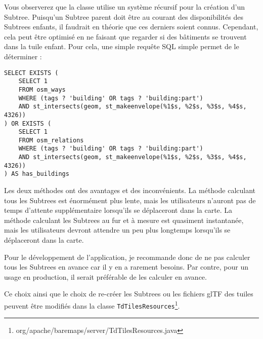 Vous observerez que la classe utilise un système récursif pour la création d'un Subtree. Puisqu'un Subtree parent doit être au courant des disponibilités des Subtrees enfants, il faudrait en théorie que ces derniers soient connus. Cependant, cela peut être optimisé en ne faisant que regarder si des bâtiments se trouvent dans la tuile enfant. Pour cela, une simple requête SQL simple permet de le déterminer :

\begin{verbatim}
SELECT EXISTS (
    SELECT 1
    FROM osm_ways
    WHERE (tags ? 'building' OR tags ? 'building:part')
    AND st_intersects(geom, st_makeenvelope(%1$s, %2$s, %3$s, %4$s, 4326))
) OR EXISTS (
    SELECT 1
    FROM osm_relations
    WHERE (tags ? 'building' OR tags ? 'building:part')
    AND st_intersects(geom, st_makeenvelope(%1$s, %2$s, %3$s, %4$s, 4326))
) AS has_buildings
\end{verbatim}

Les deux méthodes ont des avantages et des inconvénients. La méthode calculant tous les Subtrees est énormément plus lente, mais les utilisateurs n'auront pas de temps d'attente supplémentaire lorsqu'ils se déplaceront dans la carte. La méthode calculant les Subtrees au fur et à mesure est quasiment instantanée, mais les utilisateurs devront attendre un peu plus longtemps lorsqu'ils se déplaceront dans la carte.

Pour le développement de l'application, je recommande donc de ne pas calculer tous les Subtrees en avance car il y en a rarement besoins. Par contre, pour un usage en production, il serait préférable de les calculer en avance.

Ce choix ainsi que le choix de re-créer les Subtrees ou les fichiers glTF des tuiles peuvent être modifiés dans la classe \texttt{TdTilesResources}\footnote{org/apache/baremaps/server/TdTilesResources.java}.